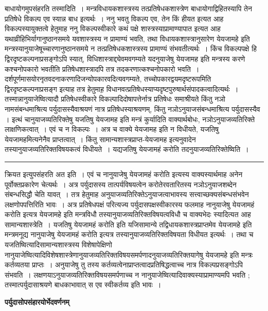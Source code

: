 \documentclass[11pt, openany]{book}
\begin{document}
 बाधायोगमुपसंहरति {\br तस्मादिति~।} मन्त्रविधायकशास्त्रस्य तत्प्रतिषेधकशास्त्रेण बाधायोगाद्विहितस्यापि तेन प्रतिषेधे विकल्प एव स्यान्न बाध  इत्यर्थः~। {\br ननु} भवतु विकल्प एव, तेन किं हीयत इत्यत आह विकल्पस्यायुक्तत्वे हेतुमाह {\br ननु} विकल्पस्वीकारे कथं
पक्षे  शास्त्रस्याप्रामाण्यापात इत्यत आह यथाव्रीहिभिर्यागानुष्ठानसमये  यवशास्त्रस्य न प्रामाण्यं भवति, तथा विधायकशास्त्रानुसारेण {\qt येयजामहे} इति मन्त्रस्यानुयाजेषूच्चारणानुष्ठानसमये न तत्प्रतिषेधकशास्त्रस्य प्रामाण्यं  संभवतीत्यर्थः~। किंच विकल्पपक्षे हि द्विरदृष्टकल्पनाप्रसङ्गोऽपि स्यात्,
विधिशास्त्राद्द्येवमवगम्यते यदनुयाजेषु {\qt येयजामह} इति मन्त्रस्य करणे कश्चनोपकारो भवतीति प्रतिषेधशास्त्रादपि तत्र तदकरणात्कश्चनोपकारो भवति~।दर्शपूर्णमासयोरनृतवदनाकरणादिजन्योपकारवदित्यवगम्यते, तच्चोपकारद्वयमदृष्टरूपमिति द्विरदृष्टकल्पनाप्रसङ्ग इत्याह तत्र
हेतुमाह़ विधानवत्प्रतिषेधस्याप्यदृष्टपुरुषार्थसंपादकत्वादित्यर्थः~। तस्मान्नानुयाजेष्वित्यादौ प्रतिषेधस्वीकारे विकल्पादिदोषापत्तेर्नात्र  प्रतिषेधः समाश्रीयते किंतु नञो नामसंबन्धमाश्रित्य पर्युदासस्यैवाश्रयणं
\newpage
\fancyhead[RE]{[ बाधायोगोपसंहारः ]}
{\bl\noindent
नात्र प्रतिषेधस्याश्रयणम्, किंतु नञोऽनुयाजसंबन्धमाश्रित्य पर्युदासस्यैव । इत्थं चानुयाजव्यतिरिक्तेषु यजतिषु येयजामह  इति मन्त्रं कुर्यादिति वाक्यार्थबोधः, नञोऽनुयाजव्यतिरिक्ते लाक्षणिकत्वात्~। एवं च न विकल्पः~। अत्र च वाक्ये येयजामह इति न विधीयते, यजतिषु येयजामहमित्यनेनैव प्राप्तत्वात्~। किंतु सामान्यशास्त्रप्राप्त-येयजामह इत्यनुवादेन तस्यानुयाजव्यतिरिक्तविषयकत्वं विधीयते~। यद्यजतिषु येयजामहं करोति  तदनुयाजव्यतिरिक्तेष्विति~।~}\\
\hrule
\vspace{3mm}
\noindent
क्रियत इत्युपसंहरति {\br अत इति~।} एवं च {\qt नानुयाजेषु येयजामहं करोति} इत्यस्य वाक्यस्यार्थमाह अनेन पूर्वोक्तप्रकारेण
चेत्यर्थः~। अत्र पर्युदासस्य तात्पर्यविषयत्वेन करोतेरवतारितस्य नञोऽनुयाजशब्देन संबन्धसिद्धौ चेति यावत्~। तत्र हेतुमाह
अनुयाजव्यतिरिक्तेऽनुयाजत्वाभावस्य सत्त्वाच्छक्यसंबन्धसंभवेन लक्षणोपपत्तिरिति भावः~। अत्र प्रतिषेधपक्षं परित्यज्य पर्युदासपक्षस्वीकारस्य फलमाह {\qt नानुयाजेषु येयजामहं करोति} इत्यत्र {\qt येयजामहे}   इति मन्त्रविधौ तस्यानुयाजव्यतिरिक्तविषयत्वविधौ च वाक्यभेदः स्यादित्यत आह {\br सामान्यशास्त्रेति~।} {\qt यजतिषु येयजामहं करोति}  इति यजिसामान्ये तद्विधायकशास्त्रप्राप्तमेव {\qt येयजामहे}  इति मन्त्रमनूद्य {\qt नानुयाजेषु येयजामहं करोति} इत्यत्र  तस्यानुयाजव्यतिरिक्तविषयता विधीयत इत्यर्थः~। तथा च यजतिष्वित्यादिसामान्यशास्त्रस्य विशेषापेक्षिणो
नानुयाजेष्वित्यादिविशेषशास्त्रेणानुयाजव्यतिरिक्तविषयसमर्पणादनुयाजव्यतिरिक्तयागेषु {\qt येयजामहे}  इति मन्त्रः कर्तव्यतया प्राप्तः~। अनुयाजेषु तु तस्य कर्तव्यत्वेनाप्राप्तत्वादप्रतिषिद्धत्वाच्च नात्र विकल्पप्रसङ्गोऽपि संभवति~। लक्षणयाऽनुयाजव्यतिरिक्तविषयसमर्पणाच्च न नानुयाजेष्वित्यादिवाक्यस्याप्रामाण्यमपि 
भवति ; तस्मात्पर्युदासाश्रयणे बाधकाभावात् स एव स्वीकर्तव्य इति भावः~।
\newpage
\fancyhead[LO]{पर्यु० भेदवर्णनम् ]}
\begin{center}
 \textbf{पर्युदासोपसंहारयोर्भेदवर्णनम् }   
\end{center}
 
\end{document}
